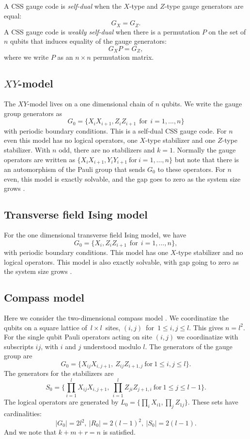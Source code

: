 \documentclass[11pt,oneside]{article}
\def\Stab{S}
\begin{document}
A CSS gauge code is \emph{self-dual} when the $X$-type and $Z$-type
gauge generators are equal: $$G_X = G_Z.$$
A CSS gauge code is \emph{weakly self-dual}
when there is a permutation $P$ on the set of $n$ qubits
that induces equality of the gauge generators:
$$
    G_X P = G_Z,
$$
where we write $P$ as an $n\times n$ permutation matrix.

\subsection{$XY$-model}

The $XY$-model \cite{Pfeuty1970}
lives on a one dimensional chain of $n$ qubits.
We write the gauge group generators as
$$
    G_0 = \{ X_i X_{i+1}, Z_i Z_{i+1}\ \ \mbox{for}\ \ i=1,...,n \}
$$
with periodic boundary conditions.
This is a self-dual CSS gauge code.
For $n$ even this model has no logical operators, one 
$X$-type stabilizer and one $Z$-type stabilizer.
With $n$ odd, there are no stabilizers and $k=1.$
Normally the gauge operators are written as 
$\{ X_i X_{i+1}, Y_i Y_{i+1} \ \mbox{for}\ i=1,...,n \}$
but note that there is an automorphism of the Pauli group
that sends $G_0$ to these operators.
For $n$ even, this model is exactly solvable,
and the gap goes to zero
as the system size grows \cite{Lieb1961}.

\subsection{Transverse field Ising model}

For the one dimensional transverse field
Ising model, we have 
$$
    G_0 = \{ X_i, Z_i Z_{i+1}\ \ \mbox{for}\ \ i=1,...,n \},
$$
with periodic boundary conditions.
This model has one 
$X$-type stabilizer and no logical operators.
This model is also exactly solvable, with gap going to zero
as the system size grows \cite{Pfeuty1970}.

\subsection{Compass model}

Here we consider the two-dimensional compass model \cite{Bacon2006}.
We coordinatize the qubits on a square 
lattice of\ $l\times l$\ sites,
$(i, j)$\ for\ $1\le i, j\le l.$
This gives $n = l^2.$
For the single qubit Pauli operators acting on site
$(i, j)$ we coordinatize with subscripts $ij$, 
with $i$ and $j$ understood modulo $l$.
The generators of the gauge group are
$$
    G_0 = \big\{ X_{ij}X_{i,j+1},\ Z_{ij}Z_{i+1,j}\ \mbox{for}\ 1\le i, j\le l\big\}.
$$
The generators for the stabilizers are
$$
    \Stab_0 = \big\{ \prod_{i=1}^l X_{ij}X_{i,j+1},\ \prod_{i=1}^l Z_{ji}Z_{j+1,i}\ \mbox{for}\ 1\le j\le l-1\big\}.
$$
The logical operators are generated by $L_0 = \big\{ \prod_i X_{i1}, \prod_j Z_{1j} \}.$
These sets have cardinalities:
$$|G_0|=2l^2,\ |R_0| = 2(l-1)^2,\ |\Stab_0| = 2(l-1).$$
And we note that $k+m+r=n$ is satisfied.
\end{document}
